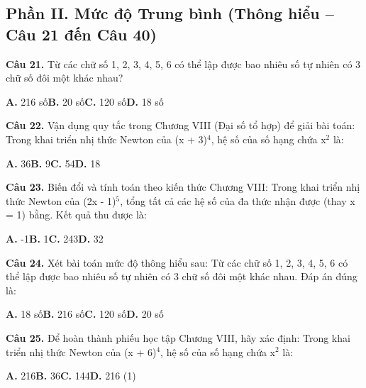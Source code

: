 \documentclass[11pt,a4paper]{article}
\begin{document}
\subsection*{\color{accent} Phần II. Mức độ Trung bình (Thông hiểu -- Câu 21 đến Câu 40)}
\textbf{\color{primary} Câu 21.} Từ các chữ số 1, 2, 3, 4, 5, 6 có thể lập được bao nhiêu số tự nhiên có 3 chữ số đôi một khác nhau?\par
\hspace*{1.5em}\textbf{A.} 216 số\quad\quad \textbf{B.} 20 số\quad\quad \textbf{C.} 120 số\quad\quad \textbf{D.} 18 số\par\vspace{2pt}
\textbf{\color{primary} Câu 22.} Vận dụng quy tắc trong Chương VIII (Đại số tổ hợp) để giải bài toán: Trong khai triển nhị thức Newton của (x + 3)$^4$, hệ số của số hạng chứa x$^2$ là:\par
\hspace*{1.5em}\textbf{A.} 36\quad\quad \textbf{B.} 9\quad\quad \textbf{C.} 54\quad\quad \textbf{D.} 18\par\vspace{2pt}
\textbf{\color{primary} Câu 23.} Biến đổi và tính toán theo kiến thức Chương VIII: Trong khai triển nhị thức Newton của (2x - 1)$^5$, tổng tất cả các hệ số của đa thức nhận được (thay x = 1) bằng. Kết quả thu được là:\par
\hspace*{1.5em}\textbf{A.} -1\quad\quad \textbf{B.} 1\quad\quad \textbf{C.} 243\quad\quad \textbf{D.} 32\par\vspace{2pt}
\textbf{\color{primary} Câu 24.} Xét bài toán mức độ thông hiểu sau: Từ các chữ số 1, 2, 3, 4, 5, 6 có thể lập được bao nhiêu số tự nhiên có 3 chữ số đôi một khác nhau. Đáp án đúng là:\par
\hspace*{1.5em}\textbf{A.} 18 số\quad\quad \textbf{B.} 216 số\quad\quad \textbf{C.} 120 số\quad\quad \textbf{D.} 20 số\par\vspace{2pt}
\textbf{\color{primary} Câu 25.} Để hoàn thành phiếu học tập Chương VIII, hãy xác định: Trong khai triển nhị thức Newton của (x + 6)$^4$, hệ số của số hạng chứa x$^2$ là:\par
\hspace*{1.5em}\textbf{A.} 216\quad\quad \textbf{B.} 36\quad\quad \textbf{C.} 144\quad\quad \textbf{D.} 216 (1)\par\vspace{2pt}
\end{document}
